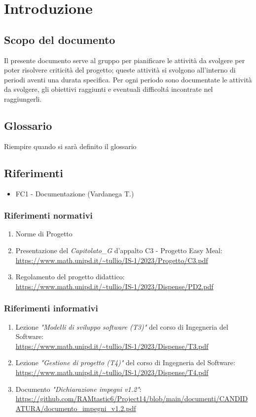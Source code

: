 \section{Introduzione}
\subsection{Scopo del documento}
Il presente documento serve al gruppo per pianificare le attività da svolgere per poter risolvere criticità del progetto; queste attività si svolgono all'interno di periodi aventi una durata specifica.
Per ogni periodo sono documentate le attività da svolgere, gli obiettivi raggiunti e eventuali difficoltá incontrate nel raggiungerli.
\subsection{Glossario}
Riempire quando si sarà definito il glossario 
\subsection{Riferimenti}
\begin{itemize}
    \item FC1 - Documentazione (Vardanega T.)
\end{itemize}

\subsubsection{Riferimenti normativi}
\begin{enumerate}
    \item Norme di Progetto
    \item Presentazione del \textit{Capitolato_G} d'appalto C3 - Progetto Easy Meal: \\ \url{https://www.math.unipd.it/~tullio/IS-1/2023/Progetto/C3.pdf}
    \item Regolamento del progetto didattico: \\ 
    \url{https://www.math.unipd.it/~tullio/IS-1/2023/Dispense/PD2.pdf}
\end{enumerate}
\subsubsection{Riferimenti informativi}
\label{sec:rif_inf}
\begin{enumerate}
    \item Lezione \emph{"Modelli di sviluppo software (T3)"} del corso di Ingegneria del Software: \\
    \url{https://www.math.unipd.it/~tullio/IS-1/2023/Dispense/T3.pdf}
    \item Lezione \emph{"Gestione di progetto (T4)"} del corso di Ingegneria del Software: \\
    \url{https://www.math.unipd.it/~tullio/IS-1/2023/Dispense/T4.pdf}
    \item Documento \emph{"Dichiarazione impegni v1.2"}: \\
    \url{https://github.com/RAMtastic6/Project14/blob/main/documenti/CANDIDATURA/documento_impegni_v1.2.pdf}
    
\end{enumerate}